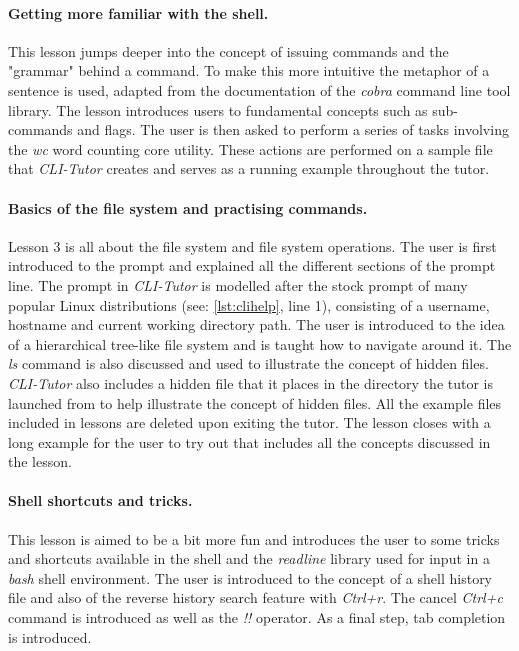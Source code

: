 \paragraph{Getting more familiar with the shell.} This lesson jumps deeper into
the concept of issuing commands and the "grammar" behind a command. To make
this more intuitive the metaphor of a sentence is used, adapted from the
documentation of the \textit{cobra} command line tool
library\cite{franciacobra}. The lesson introduces users to fundamental concepts
such as sub-commands and flags. The user is then asked to perform a series of
tasks involving the \textit{wc} word counting core utility. These actions are
performed on a sample file that \textit{CLI-Tutor} creates and serves as a
running example throughout the tutor.

\paragraph{Basics of the file system and practising commands.} Lesson 3 is all
about the file system and file system operations. The user is first introduced
to the prompt and explained all the different sections of the prompt line. The
prompt in \textit{CLI-Tutor} is modelled after the stock prompt of many popular
Linux distributions (see: \autoref{lst:clihelp}, line 1), consisting of a
username, hostname and current working directory path. The user is introduced
to the idea of a hierarchical tree-like file system and is taught how to
navigate around it. The \textit{ls} command is also discussed and used to
illustrate the concept of hidden files. \textit{CLI-Tutor} also includes a
hidden file that it places in the directory the tutor is launched from to help
illustrate the concept of hidden files. All the example files included in
lessons are deleted upon exiting the tutor. The lesson closes with a long
example for the user to try out that includes all the concepts discussed in the
lesson.

\paragraph{Shell shortcuts and tricks.} This lesson is aimed to be a bit more
fun and introduces the user to some tricks and shortcuts available in the shell
and the \textit{readline}\cite{ramey_fox_readline} library used for input in a
\textit{bash} shell environment. The user is introduced to the concept of a
shell history file and also of the reverse history search feature with
\textit{Ctrl+r}. The cancel \textit{Ctrl+c} command is introduced as well
as the \textit{!!} operator. As a final step, tab completion is introduced.

